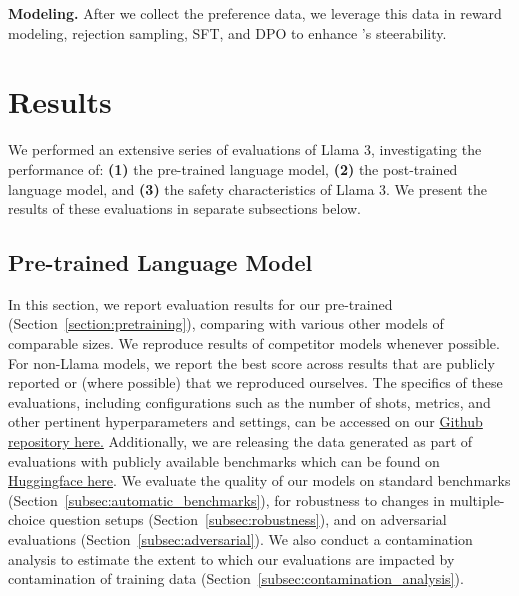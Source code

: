 \documentclass[dvipsnames]{fairmeta}
\begin{document}
\textbf{Modeling.} After we collect the preference data, we leverage this data in reward modeling, rejection sampling, SFT, and DPO to enhance \llamathree's steerability. 

\section{Results}
\label{section:results}

We performed an extensive series of evaluations of Llama 3, investigating the performance of: \textbf{(1)} the pre-trained language model, \textbf{(2)} the post-trained language model, and \textbf{(3)} the safety characteristics of Llama 3. We present the results of these evaluations in separate subsections below. 

\newcommand{\dieuwke}[1]{\textcolor{green!60!black}{DH: #1}}
\newcommand{\lovish}[1]{\textcolor{green!60!black}{LM: #1}}
\newcommand{\TBD}[1]{\textcolor{red!80!black}{\textbf{TBD:} #1}}

\subsection{Pre-trained Language Model}\label{results:pretrained_lm}

In this section, we report evaluation results for our pre-trained \llamathree (Section~\ref{section:pretraining}), comparing with various other models of comparable sizes.
We reproduce results of competitor models whenever possible.
For non-Llama models, we report the best score across results that are publicly reported or (where possible) that we reproduced ourselves.
The specifics of these evaluations, including configurations such as the number of shots, metrics, and other pertinent hyperparameters and settings, can be accessed on our \href{https://github.com/meta-llama/llama-models/blob/main/models/llama3_1/eval_details.md}{Github repository here.} Additionally, we are releasing the data generated as part of evaluations with publicly available benchmarks which can be found on \href{https://huggingface.co/meta-llama}{Huggingface here}.
We evaluate the quality of our models on standard benchmarks (Section~\ref{subsec:automatic_benchmarks}), for robustness to changes in multiple-choice question setups (Section~\ref{subsec:robustness}), and on adversarial evaluations (Section~\ref{subsec:adversarial}). 
We also conduct a contamination analysis to estimate the extent to which our evaluations are impacted by contamination of training data (Section~\ref{subsec:contamination_analysis}).
\end{document}
